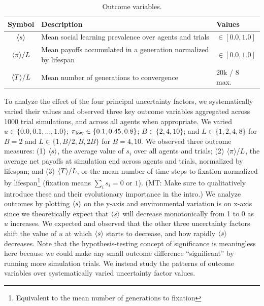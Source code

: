 \documentclass[letterpaper,11.5pt]{scrartcl}
\newcommand{\mt}[1]{{\textcolor{myorange} {({\tiny MT:} #1)}}}
\begin{document}
\begin{table}[h]
    \caption{Outcome variables.}
    \label{tab:outcomeVariables}
    \centering %
    \begin{tabular}{cp{4.25in}p{0.85in}} \toprule

        Symbol & Description & Values \\ 

        \midrule  

        $\langle s \rangle$ & Mean social learning prevalence over agents and trials
                  & $\in [0.0, 1.0]$ \\

        $\langle \pi \rangle / L$ & Mean payoffs accumulated in a generation normalized by
        lifespan & $\in [0.0, 1.0]$ \\

        $\langle T \rangle / L$ & Mean number of generations to convergence & 20k / 8 max. \\
        \bottomrule
    \end{tabular}
\end{table}

To analyze the effect of the four principal uncertainty factors, we systematically
varied their values and observed three key outcome variables aggregated across 1000
trial simulations, and across all agents when appropriate. We varied $u \in \{0.0,
0.1, \ldots, 1.0\}$; $\pi_{\mathrm{low}} \in \{0.1, 0.45, 0.8\}$; $B \in \{2, 4, 10\}$; and $L
\in \{1,2,4,8\}$ for $B=2$ and $L \in \{1,B/2,B,2B\}$ for $B=4,10$.  We observed
three outcome measures: (1) $\langle s \rangle$, the average value of $s_i$ over all agents
and trials; (2) $\langle \pi \rangle / L$, the average net payoffs at simulation end across
agents and trials, normalized by lifespan; and (3) $\langle T \rangle / L$, 
or the mean number of time steps to fixation normalized by
lifespan\footnote{Equivalent to the mean number of generations to fixation}
(fixation means $\sum_i s_i = 0 \text{ or } 1$). \mt{Make sure to qualitatively
introduce these and their evolutionary importance in the intro.}
We analyze outcomes by plotting $\langle s \rangle$ on the y-axis and environmental
variation is on x-axis since we theoretically expect that $\langle s \rangle$ will 
decrease monotonically from 1 to 0 as $u$ increases. We expected and observed
that the other three uncertainty factors shift the value of $u$ at which 
$\langle s \rangle$ starts to decrease, and how rapidly $\langle s \rangle$ decreases. Note that the
hypothesis-testing concept of significance is meaningless here because we could
make any small outcome difference ``significant'' by running more simulation trials.
We instead study the patterns of outcome 
variables over systematically varied uncertainty factor values. 
\end{document}
